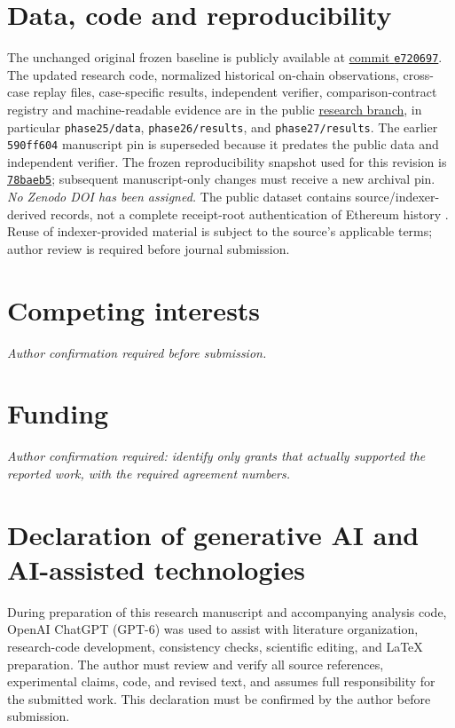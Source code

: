 \documentclass[preprint,12pt,authoryear]{elsarticle}
\begin{document}
\section*{Data, code and reproducibility}
The unchanged original frozen baseline is publicly available at \href{https://github.com/KuznetsovKarazin/blockchain-analytics-lab/commit/e720697bc3986dd291a7047c580cf973ae6e5567}{commit \texttt{e720697}}. The updated research code, normalized historical on-chain observations, cross-case replay files, case-specific results, independent verifier, comparison-contract registry and machine-readable evidence are in the public \href{https://github.com/KuznetsovKarazin/blockchain-analytics-lab/tree/research/monitoring-applicability-20261029}{research branch}, in particular \texttt{phase25/data}, \texttt{phase26/results}, and \texttt{phase27/results}. The earlier \texttt{590ff604} manuscript pin is superseded because it predates the public data and independent verifier. The frozen reproducibility snapshot used for this revision is \href{https://github.com/KuznetsovKarazin/blockchain-analytics-lab/commit/78baeb5c83a931a9f3f85e56893391f94cd0699b}{\texttt{78baeb5}}; subsequent manuscript-only changes must receive a new archival pin. \emph{No Zenodo DOI has been assigned.} The public dataset contains source/indexer-derived records, not a complete receipt-root authentication of Ethereum history \citep{Kuznetsov2026Artifacts}. Reuse of indexer-provided material is subject to the source's applicable terms; author review is required before journal submission.

\section*{Competing interests}
\textit{Author confirmation required before submission.}
\section*{Funding}
\textit{Author confirmation required: identify only grants that actually supported the reported work, with the required agreement numbers.}
\section*{Declaration of generative AI and AI-assisted technologies}
During preparation of this research manuscript and accompanying analysis code, OpenAI ChatGPT (GPT-6) was used to assist with literature organization, research-code development, consistency checks, scientific editing, and LaTeX preparation. The author must review and verify all source references, experimental claims, code, and revised text, and assumes full responsibility for the submitted work. This declaration must be confirmed by the author before submission.
\end{document}
